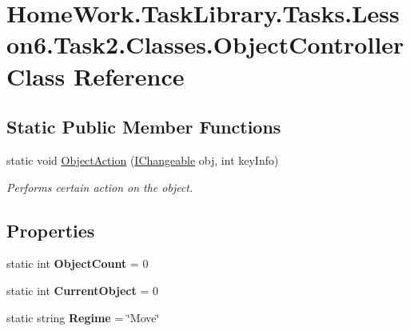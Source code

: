 \hypertarget{class_home_work_1_1_task_library_1_1_tasks_1_1_lesson6_1_1_task2_1_1_classes_1_1_object_controller}{}\section{Home\+Work.\+Task\+Library.\+Tasks.\+Lesson6.\+Task2.\+Classes.\+Object\+Controller Class Reference}
\label{class_home_work_1_1_task_library_1_1_tasks_1_1_lesson6_1_1_task2_1_1_classes_1_1_object_controller}
\subsection*{Static Public Member Functions}
\begin{DoxyCompactItemize}
\item 
static void \mbox{\hyperlink{class_home_work_1_1_task_library_1_1_tasks_1_1_lesson6_1_1_task2_1_1_classes_1_1_object_controller_a463a1fe3b5c1ee2486d0310f43c194a8}{Object\+Action}} (\mbox{\hyperlink{interface_home_work_1_1_task_library_1_1_tasks_1_1_lesson6_1_1_task2_1_1_interfaces_1_1_i_changeable}{I\+Changeable}} obj, int key\+Info)
\begin{DoxyCompactList}\small\item\em Performs certain action on the object. \end{DoxyCompactList}\end{DoxyCompactItemize}
\subsection*{Properties}
\begin{DoxyCompactItemize}
\item 
\mbox{\label{class_home_work_1_1_task_library_1_1_tasks_1_1_lesson6_1_1_task2_1_1_classes_1_1_object_controller_a5816780b7a2f498dcfe58c9a9d878dac}} 
static int {\bfseries Object\+Count} = 0
\item 
\mbox{\label{class_home_work_1_1_task_library_1_1_tasks_1_1_lesson6_1_1_task2_1_1_classes_1_1_object_controller_a6c5b78815fb5e3a49f845841f9c6ace0}} 
static int {\bfseries Current\+Object} = 0
\item 
\mbox{\label{class_home_work_1_1_task_library_1_1_tasks_1_1_lesson6_1_1_task2_1_1_classes_1_1_object_controller_af8fa72a68774ecb23333758b035fdfdf}} 
static string {\bfseries Regime} = \char`\"{}Move\char`\"{}
\end{DoxyCompactItemize}


